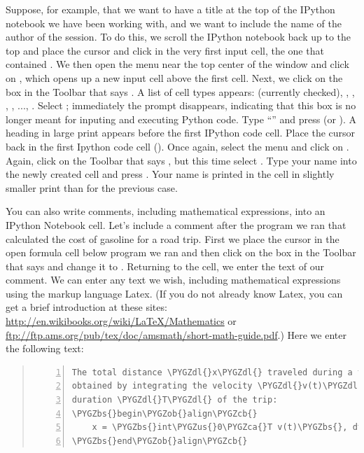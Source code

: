 \documentclass[letterpaper,10pt,english]{sphinxmanual}
\def\PYGZbs{\char`\\}
\def\PYGZus{\char`\_}
\def\PYGZob{\char`\{}
\def\PYGZcb{\char`\}}
\def\PYGZca{\char`\^}
\def\PYGZdl{\char`\$}
\begin{document}
Suppose, for example, that we want to have a title at the top of the IPython notebook we have been working with, and we want to include the name of the author of the session.  To do this, we scroll the IPython notebook back up to the top and place the cursor and click in the very first input cell, the one that contained .  We then open the  menu near the top center of the window and click on , which opens up a new input cell above the first cell.  Next, we click on the box in the Toolbar that says .  A list of cell types appears:  (currently checked), , , , , ..., .  Select ; immediately the  prompt disappears, indicating that this box is no longer meant for inputing and executing Python code.  Type ``'' and press  (or ).  A heading in large print appears before the first IPython code cell.  Place the cursor back in the first Ipython code cell ().  Once again, select the  menu and click on .  Again, click on the Toolbar that says , but this time select .  Type your name into the newly created cell and press .  Your name is printed in the cell in slightly smaller print than for the previous case.

You can also write comments, including mathematical expressions, into an IPython Notebook cell.  Let's include a comment after the program we ran that calculated the cost of gasoline for a road trip.  First we place the cursor in the open formula cell below program we ran and then click on the box in the Toolbar that says  and change it to .  Returning to the cell, we enter the text of our comment.  We can enter any text we wish, including mathematical expressions using the markup language Latex.  (If you do not already know Latex, you can get a brief introduction at these sites: \href{http://en.wikibooks.org/wiki/LaTeX/Mathematics}{http://en.wikibooks.org/wiki/LaTeX/Mathematics} or \href{ftp://ftp.ams.org/pub/tex/doc/amsmath/short-math-guide.pdf}{ftp://ftp.ams.org/pub/tex/doc/amsmath/short-math-guide.pdf}.)  Here we enter the following text:
\begin{quote}

\begin{Verbatim}[commandchars=\\\{\},numbers=left,firstnumber=1,stepnumber=1]
The total distance \PYGZdl{}x\PYGZdl{} traveled during a trip can be
obtained by integrating the velocity \PYGZdl{}v(t)\PYGZdl{} over the
duration \PYGZdl{}T\PYGZdl{} of the trip:
\PYGZbs{}begin\PYGZob{}align\PYGZcb{}
    x = \PYGZbs{}int\PYGZus{}0\PYGZca{}T v(t)\PYGZbs{}, dt
\PYGZbs{}end\PYGZob{}align\PYGZcb{}
\end{Verbatim}
\end{quote}
\end{document}
